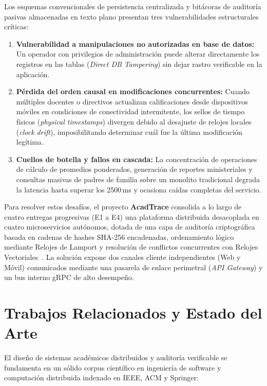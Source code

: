 \documentclass[11pt,a4paper]{article}
\begin{document}
Los esquemas convencionales de persistencia centralizada y bit\'acoras de auditor\'ia pasivas almacenadas en texto plano presentan tres vulnerabilidades estructurales cr\'iticas:
\begin{enumerate}[leftmargin=*]
  \item \textbf{Vulnerabilidad a manipulaciones no autorizadas en base de datos:} Un operador con privilegios de administraci\'on puede alterar directamente los registros en las tablas (\textit{Direct DB Tampering}) sin dejar rastro verificable en la aplicaci\'on.
  \item \textbf{P\'erdida del orden causal en modificaciones concurrentes:} Cuando m\'ultiples docentes o directivos actualizan calificaciones desde dispositivos m\'oviles en condiciones de conectividad intermitente, los sellos de tiempo f\'isicos (\textit{physical timestamps}) divergen debido al desajuste de relojes locales (\textit{clock drift}), imposibilitando determinar cu\'al fue la \'ultima modificaci\'on leg\'itima.
  \item \textbf{Cuellos de botella y fallos en cascada:} La concentraci\'on de operaciones de c\'alculo de promedios ponderados, generaci\'on de reportes ministeriales y consultas masivas de padres de familia sobre un monolito tradicional degrada la latencia hasta superar los 2500\,ms y ocasiona ca\'idas completas del servicio.
\end{enumerate}

Para resolver estos desaf\'ios, el proyecto \textbf{AcadTrace} consolida a lo largo de cuatro entregas progresivas (E1 a E4) una plataforma distribuida desacoplada en cuatro microservicios aut\'onomos, dotada de una capa de auditor\'ia criptogr\'afica basada en cadenas de hashes SHA-256 encadenadas, ordenamiento l\'ogico mediante Relojes de Lamport y resoluci\'on de conflictos concurrentes con Relojes Vectoriales~\cite{lamport1978time,fidge1988timestamps}. La soluci\'on expone dos canales cliente independientes (Web y M\'ovil) comunicados mediante una pasarela de enlace perimetral (\textit{API Gateway}) y un bus interno gRPC de alto desempe\~no.

\section{Trabajos Relacionados y Estado del Arte}
\label{sec:trabajos-relacionados}
El dise\~no de sistemas acad\'emicos distribuidos y auditor\'ia verificable se fundamenta en un s\'olido corpus cient\'ifico en ingenier\'ia de software y computaci\'on distribuida indexado en IEEE, ACM y Springer:
\end{document}
